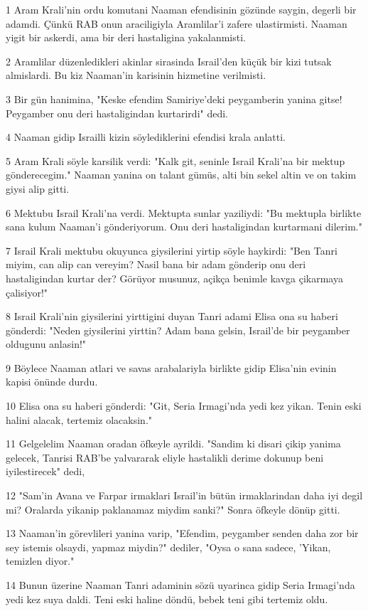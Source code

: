 \par 1 Aram Krali'nin ordu komutani Naaman efendisinin gözünde saygin, degerli bir adamdi. Çünkü RAB onun araciligiyla Aramlilar'i zafere ulastirmisti. Naaman yigit bir askerdi, ama bir deri hastaligina yakalanmisti.
\par 2 Aramlilar düzenledikleri akinlar sirasinda Israil'den küçük bir kizi tutsak almislardi. Bu kiz Naaman'in karisinin hizmetine verilmisti.
\par 3 Bir gün hanimina, "Keske efendim Samiriye'deki peygamberin yanina gitse! Peygamber onu deri hastaligindan kurtarirdi" dedi.
\par 4 Naaman gidip Israilli kizin söylediklerini efendisi krala anlatti.
\par 5 Aram Krali söyle karsilik verdi: "Kalk git, seninle Israil Krali'na bir mektup gönderecegim." Naaman yanina on talant gümüs, alti bin sekel altin ve on takim giysi alip gitti.
\par 6 Mektubu Israil Krali'na verdi. Mektupta sunlar yaziliydi: "Bu mektupla birlikte sana kulum Naaman'i gönderiyorum. Onu deri hastaligindan kurtarmani dilerim."
\par 7 Israil Krali mektubu okuyunca giysilerini yirtip söyle haykirdi: "Ben Tanri miyim, can alip can vereyim? Nasil bana bir adam gönderip onu deri hastaligindan kurtar der? Görüyor musunuz, açikça benimle kavga çikarmaya çalisiyor!"
\par 8 Israil Krali'nin giysilerini yirttigini duyan Tanri adami Elisa ona su haberi gönderdi: "Neden giysilerini yirttin? Adam bana gelsin, Israil'de bir peygamber oldugunu anlasin!"
\par 9 Böylece Naaman atlari ve savas arabalariyla birlikte gidip Elisa'nin evinin kapisi önünde durdu.
\par 10 Elisa ona su haberi gönderdi: "Git, Seria Irmagi'nda yedi kez yikan. Tenin eski halini alacak, tertemiz olacaksin."
\par 11 Gelgelelim Naaman oradan öfkeyle ayrildi. "Sandim ki disari çikip yanima gelecek, Tanrisi RAB'be yalvararak eliyle hastalikli derime dokunup beni iyilestirecek" dedi,
\par 12 "Sam'in Avana ve Farpar irmaklari Israil'in bütün irmaklarindan daha iyi degil mi? Oralarda yikanip paklanamaz miydim sanki?" Sonra öfkeyle dönüp gitti.
\par 13 Naaman'in görevlileri yanina varip, "Efendim, peygamber senden daha zor bir sey istemis olsaydi, yapmaz miydin?" dediler, "Oysa o sana sadece, 'Yikan, temizlen diyor."
\par 14 Bunun üzerine Naaman Tanri adaminin sözü uyarinca gidip Seria Irmagi'nda yedi kez suya daldi. Teni eski haline döndü, bebek teni gibi tertemiz oldu.
